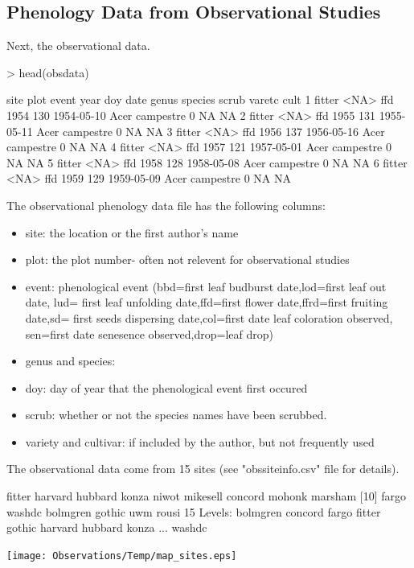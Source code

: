 \documentclass{article}
\begin{document}
\subsection{Phenology Data from Observational Studies}

Next, the observational data. 

\begin{Schunk}
\begin{Sinput}
> head(obsdata)
\end{Sinput}
\begin{Soutput}
    site plot event year doy       date genus   species scrub varetc cult
1 fitter <NA>   ffd 1954 130 1954-05-10  Acer campestre     0     NA   NA
2 fitter <NA>   ffd 1955 131 1955-05-11  Acer campestre     0     NA   NA
3 fitter <NA>   ffd 1956 137 1956-05-16  Acer campestre     0     NA   NA
4 fitter <NA>   ffd 1957 121 1957-05-01  Acer campestre     0     NA   NA
5 fitter <NA>   ffd 1958 128 1958-05-08  Acer campestre     0     NA   NA
6 fitter <NA>   ffd 1959 129 1959-05-09  Acer campestre     0     NA   NA
\end{Soutput}
\end{Schunk}

The observational phenology data file has the following columns:
\begin{itemize}
\item site: the location or the first author's name 
\item plot: the plot number- often not relevent for observational studies
\item event: phenological event (bbd=first leaf budburst date,lod=first leaf out date, lud= first leaf unfolding date,ffd=first flower date,ffrd=first fruiting date,sd= first seeds dispersing date,col=first date leaf coloration observed, sen=first date senesence observed,drop=leaf drop)
\item genus and species: 
\item doy: day of year that the phenological event first occured
\item scrub: whether or not the species names have been scrubbed.
\item variety and cultivar: if included by the author, but not frequently used
\end{itemize}

The observational data come from 15 sites (see "obssiteinfo.csv" file for details).

\begin{Schunk}
\begin{Soutput}
 [1] fitter   harvard  hubbard  konza    niwot    mikesell concord  mohonk   marsham 
[10] fargo    washdc   bolmgren gothic   uwm      rousi   
15 Levels: bolmgren concord fargo fitter gothic harvard hubbard konza ... washdc
\end{Soutput}
\end{Schunk}
\texttt{[image: Observations/Temp/map\_sites.eps]}
\end{document}
